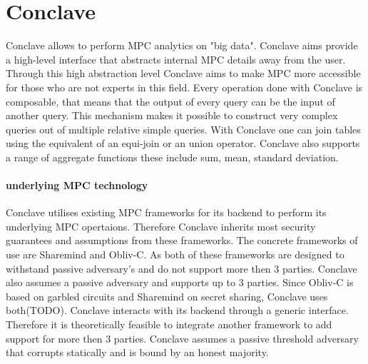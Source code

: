 \section{Conclave}
 Conclave \cite{10.1145/3302424.3303982} allows to perform MPC analytics on "big data". Conclave aims provide a high-level interface that abstracts internal MPC details away from the user. Through this high abstraction level Conclave aims to make MPC more accessible for those who are not experts in this field.  Every operation done with Conclave is composable, that means that the output of every query can be the input of another query. This mechanism makes it possible to construct very complex queries out of multiple relative simple queries.  With Conclave one can join tables using the equivalent of an equi-join or an union operator. Conclave also supports a range of aggregate functions these include sum, mean, standard deviation. 

\paragraph{underlying MPC technology}
Conclave utilises existing MPC frameworks for its backend to perform its underlying MPC opertaions. Therefore Conclave inherits most security guarantees and assumptions from these frameworks. The concrete frameworks of use are Sharemind and Obliv-C. As both of these frameworks are designed to withstand passive adversary's and do not support more then 3 parties. Conclave also assumes a passive adversary and supports up to 3 parties.
Since Obliv-C is based on garbled circuits and Sharemind on secret sharing, Conclave uses both(TODO). Conclave interacts with its backend through a generic interface. Therefore it is theoretically feasible to integrate another framework to add support for more then 3 parties. Conclave assumes a passive threshold adversary that corrupts statically and is bound by an honest majority.

